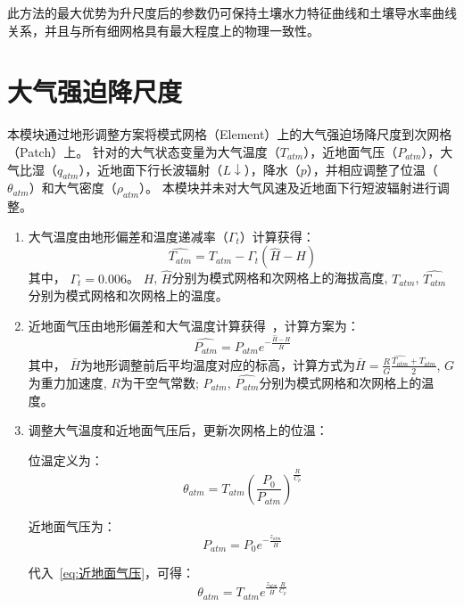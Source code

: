 此方法的最大优势为升尺度后的参数仍可保持土壤水力特征曲线和土壤导水率曲线关系，并且与所有细网格具有最大程度上的物理一致性。


\section{大气强迫降尺度}\label{大气强迫降尺度}

本模块通过地形调整方案将模式网格（Element）上的大气强迫场降尺度到次网格（Patch）上。
针对的大气状态变量为大气温度（$T_{atm}$），近地面气压（$P_{atm}$），大气比湿（$q_{atm}$），近地面下行长波辐射（$L↓$），降水（$p$），并相应调整了位温（$\theta_{atm}$）和大气密度（$\rho_{atm}$）。
本模块并未对大气风速及近地面下行短波辐射进行调整。
\begin{enumerate}

\item  大气温度由地形偏差和温度递减率（${\Gamma}_{t}$）计算获得：\\
\begin{equation}\label{T_atm}
\hat{T_{atm}}=T_{atm}-{\Gamma}_{t} \left(\hat{H}-H\right)
\end{equation}
其中，
${\Gamma}_{t}=0.006$。
$H$, $\hat{H}$分别为模式网格和次网格上的海拔高度,
$T_{atm}$, $\hat{T_{atm}}$分别为模式网格和次网格上的温度。

\item  近地面气压由地形偏差和大气温度计算获得~\citep{Cosgrove2003}，计算方案为：\\
\begin{equation}
\hat{P_{atm}}=P_{atm} e^{-\frac{\hat{H}-H}{\bar{H}}}
\end{equation}
其中，
$\bar{H}$为地形调整前后平均温度对应的标高，计算方式为$\bar{H}=\frac{R}{G} \frac{\hat{T_{atm}}+T_{atm}}{2}$, $G$为重力加速度, 
$R$为干空气常数; 
$P_{atm}$, $\hat{P_{atm}}$分别为模式网格和次网格上的温度。

\item  调整大气温度和近地面气压后，更新次网格上的位温：

位温定义为：
\begin{equation}
\theta_{atm}=T_{atm} \left(\frac{P_0}{P_{atm}}\right)^\frac{R}{C_{p}}
\end{equation}

近地面气压为：
\begin{equation}\label{eq:近地面气压}
{P_{atm}}=P_{0} e^{-\frac{z_{atm}}{\bar{H}}}
\end{equation}

代入~\eqref{eq:近地面气压}，可得：
\begin{equation}\label{eq:theta_atm}
\theta_{atm}=T_{atm} e^{\frac{z_{atm}}{\bar{H}} \frac{R}{C_{p}}}
\end{equation}


\end{enumerate}
